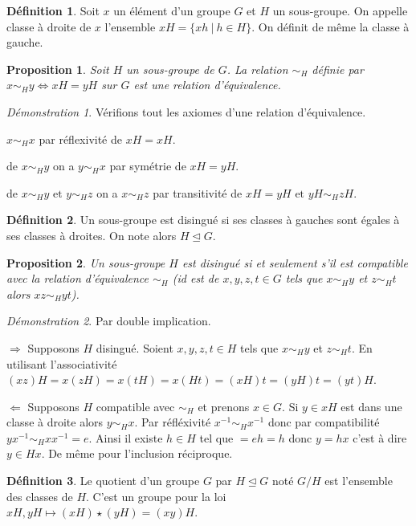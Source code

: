 \documentclass[a4paper, 11pt, french]{book}
\newenvironment{itemise}{\itemize}{\enditemize}
\theoremstyle{plain} %
\newtheorem{proposition}{Proposition}
\theoremstyle{definition} %
\newtheorem{definition}{Définition}
\theoremstyle{remark} %
\newtheorem*{demonstration}{Démonstration}
\newcommand{\1}{\mathds{1}}
\newcommand\et{\text{ et }}
\newcommand\ens[2]{\{#1 \ |\ #2\}}
\newcommand\equivalence[3]{
	\begin{demonstration}
		#1
		\begin{itemise}
			\item[$\Longrightarrow$] #2
			\item[$\Longleftarrow$] #3
		\end{itemise}
	\end{demonstration}
}
\begin{document}
\begin{definition}
	Soit $x$ un élément d'un groupe $G$ et $H$ un sous-groupe.
	On appelle classe à droite de $x$ l'ensemble $xH = \ens{xh}{h\in H}$.
	On définit de même la classe à gauche.
\end{definition}

\begin{proposition}
	Soit $H$ un sous-groupe de $G$.
	La relation $\sim_H$ définie par $x\sim_H y\iff xH = yH$  sur $G$ est une relation d'équivalence.
\end{proposition}

\begin{demonstration}
	Vérifions tout les axiomes d'une relation d'équivalence.
	\begin{itemise}
		\item $x\sim_H x$ par réflexivité de $xH = xH$.
		\item de $x\sim_H y$ on a $y\sim_H x$ par symétrie de $xH = yH$.
		\item de $x\sim_H y\et y\sim_H z$ on a $x\sim_H z$ par transitivité de $xH = yH\et yH\sim_H zH$.
	\end{itemise}
\end{demonstration}

\begin{definition}
	Un sous-groupe est disingué si ses classes à gauches sont égales à ses classes à droites.
	On note alors $H \trianglelefteq G$.
\end{definition}

\begin{proposition}
	Un sous-groupe $H$ est disingué si et seulement s'il est compatible avec la relation d'équivalence $\sim_H$
	(id est de $x, y, z, t\in G$ tels que $x\sim_H y$ et $z\sim_H t$ alors $xz\sim_H yt$).
\end{proposition}

\equivalence{Par double implication.}{
	Supposons $H$ disingué.
	Soient $x, y, z, t\in H$ tels que $x\sim_H y$ et $z\sim_H t$.
	En utilisant l'associativité $(xz)H = x(zH) = x(tH) = x(Ht) = (xH)t = (yH)t = (yt)H$.
}{
	Supposons $H$ compatible avec $\sim_H$ et prenons $x\in G$.
	Si $y\in xH$ est dans une classe à droite alors $y\sim_H x$.
	Par réfléxivité $x^{-1}\sim_H x^{-1}$ donc par compatibilité $yx^{-1}\sim_H xx^{-1}=e$.
	Ainsi il existe $h\in H$ tel que $ = eh = h$ donc $y=hx$ c'est à dire $y\in Hx$.
	De même pour l'inclusion réciproque.
}

\begin{definition}
	Le quotient d'un groupe $G$ par $H\trianglelefteq G$ noté $G/H$ est l'ensemble des classes de $H$.
	C'est un groupe pour la loi $xH, yH\longmapsto (xH)\star(yH)=(xy)H$.
\end{definition}
\end{document}
